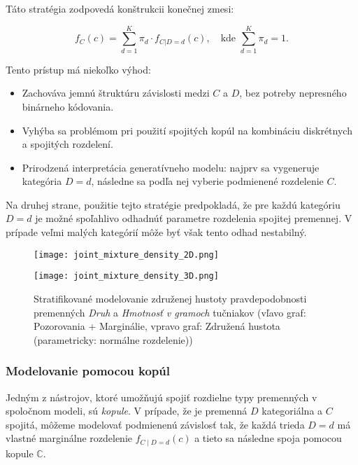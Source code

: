 Táto stratégia zodpovedá konštrukcii konečnej zmesi:

\begin{equation}
f_C(c) = \sum_{d=1}^{K} \pi_d \cdot f_{C|D=d}(c), \quad \text{kde } \sum_{d=1}^{K} \pi_d = 1.
\end{equation}

Tento prístup má niekoľko výhod:
\begin{itemize}
  \item Zachováva jemnú štruktúru závislosti medzi $C$ a $D$, bez potreby nepresného binárneho kódovania.
  \item Vyhýba sa problémom pri použití spojitých kopúl na kombináciu diskrétnych a spojitých rozdelení.
  \item Prirodzená interpretácia generatívneho modelu: najprv sa vygeneruje kategória $D = d$, následne sa podľa nej vyberie podmienené rozdelenie $C$.
\end{itemize}

Na druhej strane, použitie tejto stratégie predpokladá, že pre každú kategóriu $D = d$ je možné spoľahlivo odhadnúť parametre rozdelenia spojitej premennej. V prípade veľmi malých kategórií môže byť však tento odhad nestabilný.

\bigskip

\begin{figure}[H]
    \centering
    \begin{minipage}[t]{0.48\linewidth}
        \centering
        \texttt{[image: joint\_mixture\_density\_2D.png]}
    \end{minipage}
    \hfill
    \begin{minipage}[t]{0.48\linewidth}
        \centering
        \texttt{[image: joint\_mixture\_density\_3D.png]}
    \end{minipage}
    \caption{Stratifikované modelovanie združenej hustoty pravdepodobnosti premenných \textit{Druh} a \textit{Hmotnosť v gramoch} tučniakov (vľavo graf: Pozorovania + Marginálie, vpravo graf: Združená hustota (parametricky: normálne rozdelenie))}
    \label{fig:stratified_modelling_mix_density}
\end{figure}

\subsubsection{Modelovanie pomocou kopúl}\label{copula_joint_density}

Jedným z nástrojov, ktoré umožňujú spojiť rozdielne typy premenných v spoločnom modeli, sú \textit{kopule}. V prípade, že je premenná $D$ kategoriálna a $C$ spojitá, môžeme modelovať podmienenú závislosť tak, že každá trieda $D = d$ má vlastné marginálne rozdelenie $f_{C \mid D = d}(c)$ a tieto sa následne spoja pomocou kopule $\mathbb{C}$.

